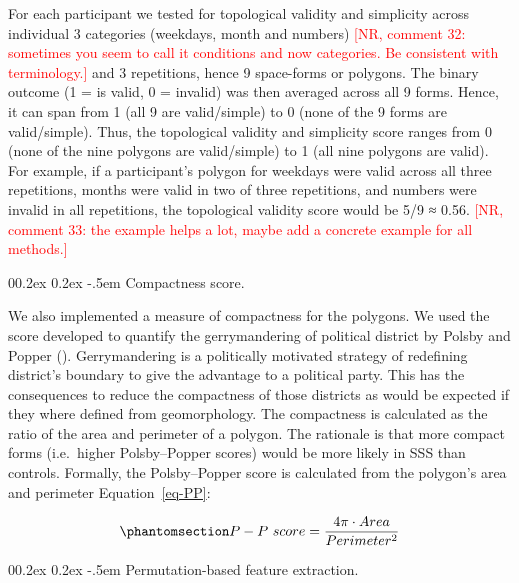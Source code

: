 \documentclass[
  man,
  longtable,
  a4paper,
  nolmodern,
  notxfonts,
  notimes,
  colorlinks=true,linkcolor=blue,citecolor=blue,urlcolor=blue]{apa7}
\makeatletter
\renewcommand{\paragraph}{\@startsection{paragraph}{4}{\parindent}%
	{0\baselineskip \@plus 0.2ex \@minus 0.2ex}%
	{-.5em}%
	{\normalfont\normalsize\bfseries\typesectitle}}
\makeatother
\begin{document}
For each participant we tested for topological validity and simplicity
across individual 3 categories (weekdays, month and numbers)
\textcolor{red}{[NR, comment 32: sometimes you seem to call it conditions and now categories. Be consistent with terminology.]}
and 3 repetitions, hence 9 space-forms or polygons. The binary outcome
(1 = is valid, 0 = invalid) was then averaged across all 9 forms. Hence,
it can span from 1 (all 9 are valid/simple) to 0 (none of the 9 forms
are valid/simple). Thus, the topological validity and simplicity score
ranges from 0 (none of the nine polygons are valid/simple) to 1 (all
nine polygons are valid). For example, if a participant's polygon for
weekdays were valid across all three repetitions, months were valid in
two of three repetitions, and numbers were invalid in all repetitions,
the topological validity score would be 5/9 ≈ 0.56.
\textcolor{red}{[NR, comment 33: the example helps a lot, maybe add a concrete example for all methods.]}

\paragraph{Compactness score.}\label{compactness-score}

We also implemented a measure of compactness for the polygons. We used
the score developed to quantify the gerrymandering of political district
by Polsby and Popper (). Gerrymandering
is a politically motivated strategy of redefining district's boundary to
give the advantage to a political party. This has the consequences to
reduce the compactness of those districts as would be expected if they
where defined from geomorphology. The compactness is calculated as the
ratio of the area and perimeter of a polygon. The rationale is that more
compact forms (i.e.~higher Polsby--Popper scores) would be more likely
in SSS than controls. Formally, the Polsby--Popper score is calculated
from the polygon's area and perimeter Equation~\ref{eq-PP}:

\begin{equation}\phantomsection\label{eq-PP}{
P - P\ score = \frac{4\pi \cdot Area}{Perimeter^2}
}\end{equation}

\paragraph{Permutation-based feature
extraction.}\label{sec-permutation-based-feature-extraction}
\end{document}
